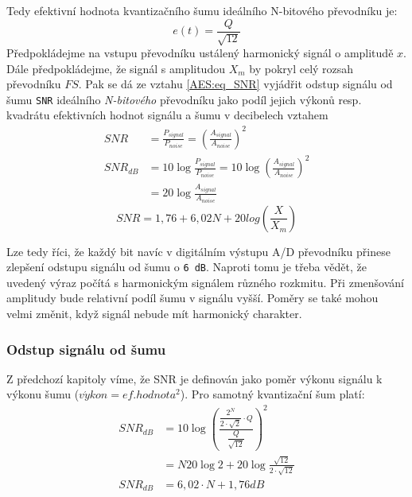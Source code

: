         Tedy efektivní hodnota kvantizačního šumu ideálního N-bitového převodníku je:
        \begin{equation}\label{AES:eq_ef_kv_sumu}
            e(t) = \frac{Q}{\sqrt{12}}
        \end{equation}
        Předpokládejme na vstupu převodníku ustálený harmonický signál o amplitudě \(x\). Dále 
        předpokládejme, že signál s amplitudou $X_m$ by pokryl celý rozsah převodníku $FS$. Pak se 
        dá ze vztahu \ref{AES:eq_SNR} vyjádřit odstup signálu od šumu \texttt{SNR} ideálního 
        \emph{N-bitového} převodníku jako podíl jejich výkonů resp. kvadrátu efektivních hodnot 
        signálu a šumu v decibelech vztahem
        \begin{align*}
          SNR      &= \frac{P_{signal}}{P_{noise}} =     
                      \left(\frac{A_{signal}}{A_{noise}}\right)^2         \\
          SNR_{dB} &= 10\log\frac{P_{signal}}{P_{noise}} =       
                      10\log\left(\frac{A_{signal}}{A_{noise}}\right)^2   \\
                   &= 20\log\frac{A_{signal}}{A_{noise}}                  
        \end{align*}
        \begin{equation}\label{AES:eq_SNR_N}
            SNR  = 1,76 + 6,02N + 20log\left(\frac{X}{X_m}\right)
        \end{equation}

        Lze tedy říci, že každý bit navíc v digitálním výstupu A/D převodníku přinese zlepšení 
        odstupu signálu od šumu o \texttt{6 dB}. Naproti tomu je třeba vědět, že uvedený výraz 
        počítá s harmonickým signálem různého rozkmitu. Při zmenšování amplitudy bude relativní 
        podíl šumu v signálu vyšší. Poměry se také mohou velmi změnit, když signál nebude mít 
        harmonický charakter.

      \subsubsection{Odstup signálu od šumu}\label{AES:cap_SNR}
        Z předchozí kapitoly víme, že SNR je definován jako poměr výkonu signálu k výkonu šumu
        ($v\acute{y}kon = ef. hodnota^2$). Pro samotný kvantizační šum platí:
        \begin{align}
          SNR_{dB} &= 10\log\left(\frac{\dfrac{2^N}{2\cdot\sqrt{2}}\cdot     
                                        Q}{\dfrac{Q}{\sqrt{12}}}\right)^2          \nonumber \\
                   &= N20\log2 + 20\log\frac{\sqrt{12}}{2\cdot\sqrt{12}}           \nonumber \\ 
          SNR_{dB} &= 6,02\cdot N + 1,76dB
        \end{align}

